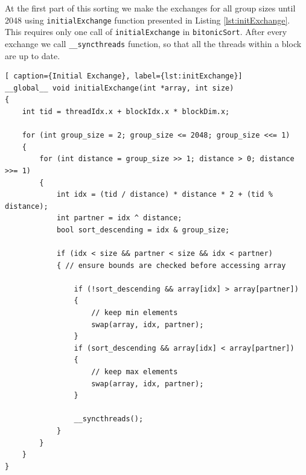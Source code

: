 \documentclass[a4paper,12pt]{article}
\begin{document}
At the first part of this sorting we make the exchanges for all group sizes until 2048 using \texttt{initialExchange} function presented in Listing \ref{lst:initExchange}. This requires only one call of \texttt{initialExchange} in \texttt{bitonicSort}. After every exchange we call \texttt{\_\_syncthreads} function, so that all the threads within a block are up to date.
\\
\begin{lstlisting}[ caption={Initial Exchange}, label={lst:initExchange}]
__global__ void initialExchange(int *array, int size)
{
    int tid = threadIdx.x + blockIdx.x * blockDim.x;

    for (int group_size = 2; group_size <= 2048; group_size <<= 1)
    {
        for (int distance = group_size >> 1; distance > 0; distance >>= 1)
        {
            int idx = (tid / distance) * distance * 2 + (tid % distance);
            int partner = idx ^ distance;
            bool sort_descending = idx & group_size;

            if (idx < size && partner < size && idx < partner)
            { // ensure bounds are checked before accessing array

                if (!sort_descending && array[idx] > array[partner])
                {
                    // keep min elements
                    swap(array, idx, partner);
                }
                if (sort_descending && array[idx] < array[partner])
                {
                    // keep max elements
                    swap(array, idx, partner);
                }

                __syncthreads();
            }
        }
    }
}
\end{lstlisting}
\end{document}
